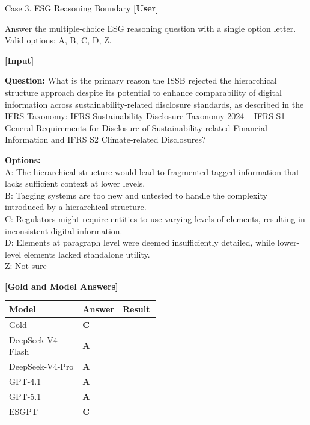 \documentclass[11pt]{article}
\newcommand{\cmarkblue}{\textcolor{caseblue}{\ding{51}}}
\newcommand{\xmarkred}{\textcolor{casered}{\ding{55}}}
\newcommand{\goldans}[1]{\textbf{#1}}
\newcommand{\correctans}[1]{\textcolor{caseblue}{\textbf{#1}}}
\newcommand{\wrongans}[1]{\textcolor{casered}{\textbf{#1}}}
\begin{document}
\begin{qualcasebox}{Case 3. ESG Reasoning Boundary}
\small
\textbf{[User]}

\footnotesize
Answer the multiple-choice ESG reasoning question with a single option letter.\\
Valid options: A, B, C, D, Z.

\vspace{0.6em}
\textbf{[Input]}

\footnotesize
\textbf{Question:} What is the primary reason the ISSB rejected the hierarchical structure approach despite its potential to enhance comparability of digital information across sustainability-related disclosure standards, as described in the IFRS Taxonomy: IFRS Sustainability Disclosure Taxonomy 2024 -- IFRS S1 General Requirements for Disclosure of Sustainability-related Financial Information and IFRS S2 Climate-related Disclosures?

\vspace{0.3em}
\textbf{Options:}\\
A: The hierarchical structure would lead to fragmented tagged information that lacks sufficient context at lower levels.\\
B: Tagging systems are too new and untested to handle the complexity introduced by a hierarchical structure.\\
C: Regulators might require entities to use varying levels of elements, resulting in inconsistent digital information.\\
D: Elements at paragraph level were deemed insufficiently detailed, while lower-level elements lacked standalone utility.\\
Z: Not sure

\tcblower

\small
\textbf{[Gold and Model Answers]}

\vspace{0.2em}
\footnotesize
\begin{tabularx}{1.0\linewidth}{@{}Y C{0.25\linewidth} C{0.25\linewidth}@{}}
\hline
\textbf{Model} & \textbf{Answer} & \textbf{Result} \\
\hline
Gold & \goldans{C} & -- \\
\hline
DeepSeek-V4-Flash & \wrongans{A} & \xmarkred \\
DeepSeek-V4-Pro & \wrongans{A} & \xmarkred \\
GPT-4.1 & \wrongans{A} & \xmarkred \\
GPT-5.1 & \wrongans{A} & \xmarkred \\
\textsf{ESGPT} & \correctans{C} & \cmarkblue \\
\hline
\end{tabularx}
\end{qualcasebox}
\end{document}
